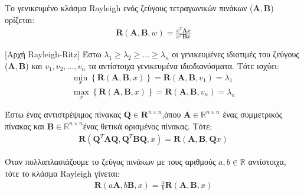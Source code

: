 \begin{definition} \label{def:1.7}
Το γενικευμένο κλάσμα \en Rayleigh \gr ενός ζεύγους τετραγωνικών πινάκων \en ($\mathbf{A},\mathbf{B}$) ορίζεται: \en
\begin{align*}
    \mathbf{R} \left( \mathbf{A},\mathbf{B},w \right) = \frac{x^T \mathbf{A} x}{ x^T \mathbf{B} x}
\end{align*}
\end{definition}
\gr
\begin{theorem}\label{th:1.6} [Aρχή \en Rayleigh-Ritz]
Έστω \en $\lambda_1 \geq \lambda_2 \geq \ldots \geq \lambda_n$ \gr οι γενικευμένες ιδιοτιμές του ζεύγους \en ($\mathbf{A},\mathbf{B}$) \gr και \en $v_1, v_2, \ldots, v_n$ \gr τα αντίστοιχα γενικευμένα ιδιοδιανύσματα. Τότε ισχύει:\en
\begin{align*}
    \min_{x} \left\{ \mathbf{R}(\mathbf{A},\mathbf{B},x) \right\} = \mathbf{R}(\mathbf{A},\mathbf{B},v_1) = \lambda_1 \\
    \max_{x} \left\{ \mathbf{R}(\mathbf{A},\mathbf{B},x) \right\} = \mathbf{R}(\mathbf{A},\mathbf{B},v_n) = \lambda_n
\end{align*}
\end{theorem}
\gr
\begin{proposition} \label{prop:1.2}
Έστω ένας αντιστρέψιμος πίνακας \en $\mathbf{Q} \in \mathbf{R}^{n \times n}$,\gr όπου \en $\mathbf{A} \in \mathbb{R}^{n \times n}$ \gr ένας συμμετρικός πίνακας και \en $\mathbf{B} \in \mathbb{R}^{n \times n}$\gr ένας θετικά ορισμένος πίνακας. Τότε: \en
\begin{align*}
    \mathbf{R} (\mathbf{Q}^T \mathbf{A} \mathbf{Q},\mathbf{Q}^T \mathbf{B} \mathbf{Q},x) = \mathbf{R} (\mathbf{A},\mathbf{B},\mathbf{Q}x)
\end{align*}
\end{proposition}
\gr
\begin{proposition} \label{prop:1.3}
Όταν πολλαπλασιάζουμε το ζεύγος πινάκων με τους αριθμούς \en $a,b \in \mathbb{R}$ \gr αντίστοιχα, τότε το κλάσμα \en Rayleigh \gr γίνεται: \en
\begin{align*}
   \mathbf{R}(a\mathbf{A},b\mathbf{B},x) = \frac{a}{b}  \mathbf{R}(\mathbf{A},\mathbf{B},x)
\end{align*}
\end{proposition}
